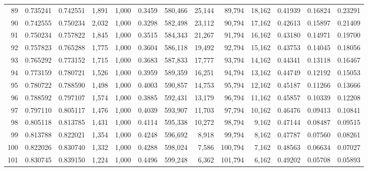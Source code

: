 \begin{tabular}{rrrrrrrrrrrrr}
89  &  0.735241 &  0.742551 &   1,891 &  1,000 &                                     0.3459 &  580,466 &   25,144 &   89,794 &   18,162 &  0.41939 &  0.16824 &  0.23291 \\
90  &  0.742555 &  0.750234 &   2,032 &  1,000 &                                     0.3298 &  582,498 &   23,112 &   90,794 &   17,162 &  0.42613 &  0.15897 &  0.21409 \\
91  &  0.750234 &  0.757822 &   1,845 &  1,000 &                                     0.3515 &  584,343 &   21,267 &   91,794 &   16,162 &  0.43180 &  0.14971 &  0.19700 \\
92  &  0.757823 &  0.765288 &   1,775 &  1,000 &                                     0.3604 &  586,118 &   19,492 &   92,794 &   15,162 &  0.43753 &  0.14045 &  0.18056 \\
93  &  0.765292 &  0.773152 &   1,715 &  1,000 &                                     0.3683 &  587,833 &   17,777 &   93,794 &   14,162 &  0.44341 &  0.13118 &  0.16467 \\
94  &  0.773159 &  0.780721 &   1,526 &  1,000 &                                     0.3959 &  589,359 &   16,251 &   94,794 &   13,162 &  0.44749 &  0.12192 &  0.15053 \\
95  &  0.780722 &  0.788590 &   1,498 &  1,000 &                                     0.4003 &  590,857 &   14,753 &   95,794 &   12,162 &  0.45187 &  0.11266 &  0.13666 \\
96  &  0.788592 &  0.797107 &   1,574 &  1,000 &                                     0.3885 &  592,431 &   13,179 &   96,794 &   11,162 &  0.45857 &  0.10339 &  0.12208 \\
97  &  0.797110 &  0.805117 &   1,476 &  1,000 &                                     0.4039 &  593,907 &   11,703 &   97,794 &   10,162 &  0.46476 &  0.09413 &  0.10841 \\
98  &  0.805118 &  0.813785 &   1,431 &  1,000 &                                     0.4114 &  595,338 &   10,272 &   98,794 &    9,162 &  0.47144 &  0.08487 &  0.09515 \\
99  &  0.813788 &  0.822021 &   1,354 &  1,000 &                                     0.4248 &  596,692 &    8,918 &   99,794 &    8,162 &  0.47787 &  0.07560 &  0.08261 \\
100 &  0.822026 &  0.830740 &   1,332 &  1,000 &                                     0.4288 &  598,024 &    7,586 &  100,794 &    7,162 &  0.48563 &  0.06634 &  0.07027 \\
101 &  0.830745 &  0.839150 &   1,224 &  1,000 &                                     0.4496 &  599,248 &    6,362 &  101,794 &    6,162 &  0.49202 &  0.05708 &  0.05893 \\

\end{tabular}
